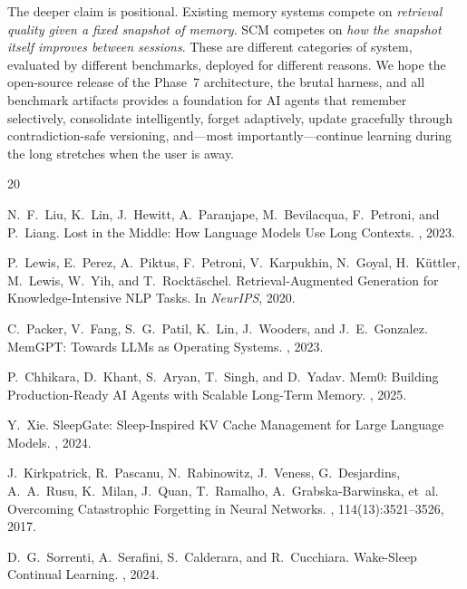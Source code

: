 \documentclass[11pt,twocolumn]{article}
\begin{document}
The deeper claim is positional. Existing memory systems compete on \emph{retrieval quality given a fixed snapshot of memory}. SCM competes on \emph{how the snapshot itself improves between sessions}. These are different categories of system, evaluated by different benchmarks, deployed for different reasons. We hope the open-source release of the Phase~7 architecture, the brutal harness, and all benchmark artifacts provides a foundation for AI agents that remember selectively, consolidate intelligently, forget adaptively, update gracefully through contradiction-safe versioning, and---most importantly---continue learning during the long stretches when the user is away.


\begin{thebibliography}{20}

N.~F.~Liu, K.~Lin, J.~Hewitt, A.~Paranjape, M.~Bevilacqua, F.~Petroni, and P.~Liang.
\newblock Lost in the Middle: How Language Models Use Long Contexts.
, 2023.

P.~Lewis, E.~Perez, A.~Piktus, F.~Petroni, V.~Karpukhin, N.~Goyal, H.~K{\"u}ttler, M.~Lewis, W.~Yih, and T.~Rockt{\"a}schel.
\newblock Retrieval-Augmented Generation for Knowledge-Intensive NLP Tasks.
\newblock In {\em NeurIPS}, 2020.

C.~Packer, V.~Fang, S.~G.~Patil, K.~Lin, J.~Wooders, and J.~E.~Gonzalez.
\newblock MemGPT: Towards LLMs as Operating Systems.
, 2023.

P.~Chhikara, D.~Khant, S.~Aryan, T.~Singh, and D.~Yadav.
\newblock Mem0: Building Production-Ready AI Agents with Scalable Long-Term Memory.
, 2025.

Y.~Xie.
\newblock SleepGate: Sleep-Inspired KV Cache Management for Large Language Models.
, 2024.

J.~Kirkpatrick, R.~Pascanu, N.~Rabinowitz, J.~Veness, G.~Desjardins, A.~A.~Rusu, K.~Milan, J.~Quan, T.~Ramalho, A.~Grabska-Barwinska, et~al.
\newblock Overcoming Catastrophic Forgetting in Neural Networks.
, 114(13):3521--3526, 2017.

D.~G.~Sorrenti, A.~Serafini, S.~Calderara, and R.~Cucchiara.
\newblock Wake-Sleep Continual Learning.
, 2024.


\end{thebibliography}
\end{document}
